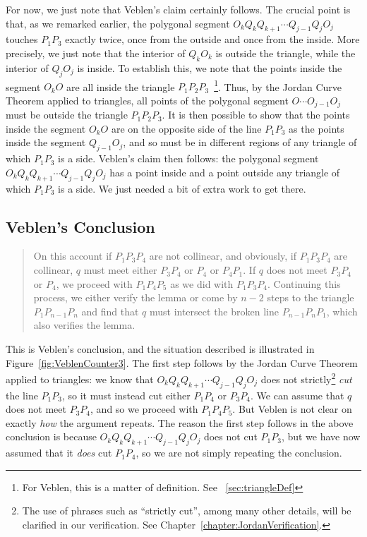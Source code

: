 For now, we just note that Veblen's claim certainly follows. The crucial point is that, as we remarked earlier, the polygonal segment $O_kQ_kQ_{k+1}\cdots Q_{j-1}Q_jO_j$ touches $P_1P_3$ exactly twice, once from the outside and once from the inside. More precisely, we just note that the interior of $Q_kO_k$ is outside the triangle, while the interior of $Q_jO_j$ is inside. To establish this, we note that the points inside the segment $O_kO$ are all inside the triangle $P_1P_2P_3$~\footnote{For Veblen, this is a matter of definition. See ~\ref{sec:triangleDef}}. Thus, by the Jordan Curve Theorem applied to triangles, all points of the polygonal segment $O\cdots O_{j-1}O_j$ must be outside the triangle $P_1P_2P_3$. It is then possible to show that the points inside the segment $O_kO$ are on the opposite side of the line $P_1P_3$ as the points inside the segment $Q_{j-1}O_j$, and so must be in different regions of any triangle of which $P_1P_3$ is a side. Veblen's claim then follows: the polygonal segment $O_kQ_kQ_{k+1}\cdots Q_{j-1}Q_jO_j$ has a point inside and a point outside any triangle of which $P_1P_3$ is a side. We just needed a bit of extra work to get there.

\subsection{Veblen's Conclusion}
\begin{quote}On this account if $P_1P_3P_4$ are not collinear, and obviously, if $P_1P_3P_4$ are collinear, $q$ must meet either $P_3P_4$ or $P_4$ or $P_4P_1$. If $q$ does not meet $P_3P_4$ or $P_4$, we proceed with $P_1P_4P_5$ as we did with $P_1P_3P_4$. Continuing this process, we either verify the lemma or come by $n-2$ steps to the triangle $P_1P_{n-1}P_n$ and find that $q$ must intersect the broken line $P_{n-1}P_nP_1$, which also verifies the lemma.\end{quote}

This is Veblen's conclusion, and the situation described is illustrated in Figure~\ref{fig:VeblenCounter3}. The first step follows by the Jordan Curve Theorem applied to triangles: we know that $O_kQ_kQ_{k+1}\cdots Q_{j-1}Q_jO_j$ does not strictly\footnote{The use of phrases such as ``strictly cut'', among many other details, will be clarified in our verification. See Chapter~\ref{chapter:JordanVerification}.} \emph{cut} the line $P_1P_3$, so it must instead cut either $P_1P_4$ or $P_3P_4$. We can assume that $q$ does not meet $P_3P_4$, and so we proceed with $P_1P_4P_5$. But Veblen is not clear on exactly \emph{how} the argument repeats. The reason the first step follows in the above conclusion is because $O_kQ_kQ_{k+1}\cdots Q_{j-1}Q_jO_j$ does not cut $P_1P_3$, but we have now assumed that it \emph{does} cut $P_1P_4$, so we are not simply repeating the conclusion. 

